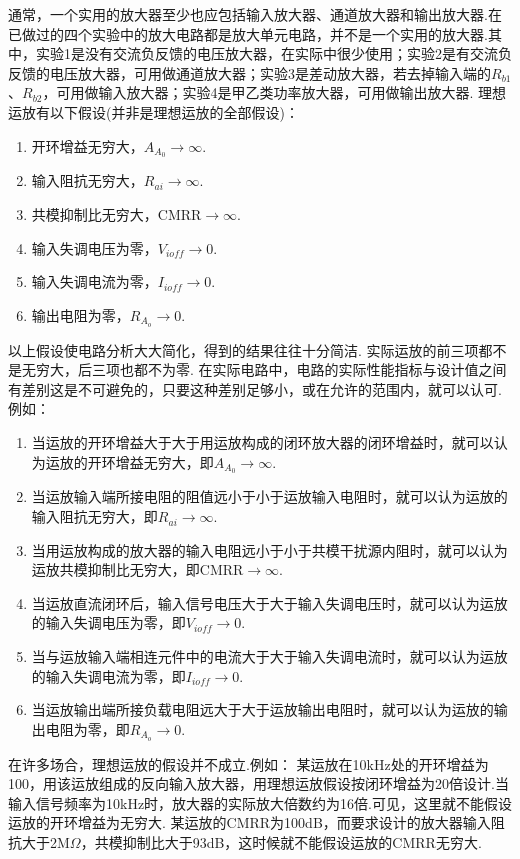 \documentclass[a4paper]{article}
\begin{document}
通常，一个实用的放大器至少也应包括输入放大器、通道放大器和输出放大器.在已做过的四个实验中的放大电路都是放大单元电路，并不是一个实用的放大器.其中，实验1是没有交流负反馈的电压放大器，在实际中很少使用；实验2是有交流负反馈的电压放大器，可用做通道放大器；实验3是差动放大器，若去掉输入端的$R_{b1}$、$R_{b2}$，可用做输入放大器；实验4是甲乙类功率放大器，可用做输出放大器.
\newpage
理想运放有以下假设(并非是理想运放的全部假设)：
\begin{enumerate}
\item 开环增益无穷大，$A_{A_0}\to\infty$.
\item 输入阻抗无穷大，$R_{ai}\to\infty$.
\item 共模抑制比无穷大，CMRR$\to\infty$.
\item 输入失调电压为零，$V_{ioff}\to$0.
\item 输入失调电流为零，$I_{ioff}\to$0.
\item 输出电阻为零，$R_{A_o}\to$0.
\end{enumerate}
以上假设使电路分析大大简化，得到的结果往往十分简洁.
实际运放的前三项都不是无穷大，后三项也都不为零.
在实际电路中，电路的实际性能指标与设计值之间有差别这是不可避免的，只要这种差别足够小，或在允许的范围内，就可以认可.例如：
\begin{enumerate}
\item 当运放的开环增益大于大于用运放构成的闭环放大器的闭环增益时，就可以认为运放的开环增益无穷大，即$A_{A_0}\to\infty$.
\item 当运放输入端所接电阻的阻值远小于小于运放输入电阻时，就可以认为运放的输入阻抗无穷大，即$R_{ai}\to\infty$.
\item 当用运放构成的放大器的输入电阻远小于小于共模干扰源内阻时，就可以认为运放共模抑制比无穷大，即CMRR$\to\infty$.
\item 当运放直流闭环后，输入信号电压大于大于输入失调电压时，就可以认为运放的输入失调电压为零，即$V_{ioff}\to0$.
\item 当与运放输入端相连元件中的电流大于大于输入失调电流时，就可以认为运放的输入失调电流为零，即$I_{ioff}\to0$.
\item 当运放输出端所接负载电阻远大于大于运放输出电阻时，就可以认为运放的输出电阻为零，即$R_{A_o}\to0$.
\end{enumerate}
在许多场合，理想运放的假设并不成立.例如：
某运放在10kHz处的开环增益为100，用该运放组成的反向输入放大器，用理想运放假设按闭环增益为20倍设计.当输入信号频率为10kHz时，放大器的实际放大倍数约为16倍.可见，这里就不能假设运放的开环增益为无穷大.
某运放的CMRR为100dB，而要求设计的放大器输入阻抗大于2M$\Omega$，共模抑制比大于93dB，这时候就不能假设运放的CMRR无穷大.
\end{document}
